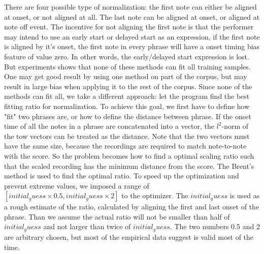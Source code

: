    There are four possible type of normalization: the first note can either be aligned at onset, or not aligned at all. The last note can be aligned at onset, or aligned at note off event.  The incentive for not aligning the first note is that the performer may intend to use an early start or delayed start as an expression, if the first note is aligned by it's onset, the first note in every phrase will have a onset timing bias feature of value zero. In other words, the early/delayed start expression is lost. %
   But experiments shows that none of these methods can fit all training samples. One may get good result by using one method on part of the corpus, but may result in large bias when applying it to the rest of the corpus. Since none of the methods can fit all, we take a different approach: let the program find the best fitting ratio for normalization. To achieve this goal, we first have to define how "fit" two phrases are, or how to define the distance between phrase. If the onset time of all the notes in a phrase are concatenated into a vector, the $l^2$-norm of the tow vectors can be treated as the distance. Note that the two vectors must have the same size, because the recordings are required to match note-to-note with the score. So the problem becomes how to find a optimal scaling ratio such that the scaled recording has the minimum distance from the score. The Brent's method\cite{TODO:brent1973} is used to find the optimal ratio. To speed up the optimization and prevent extreme values, we imposed a range of $[initial_guess \times 0.5 , initial_guess \times 2]$ to the optimizer. The $initial_guess$ is used as a rough estimate of the ratio, calculated by aligning the first and last onset of the phrase. Than we assume the actual ratio will not be smaller than half of $initial_guess$ and not larger than twice of $initial_guess$. The two numbers 0.5 and 2 are arbitrary chosen, but most of the empirical data suggest is valid most of the time. 




